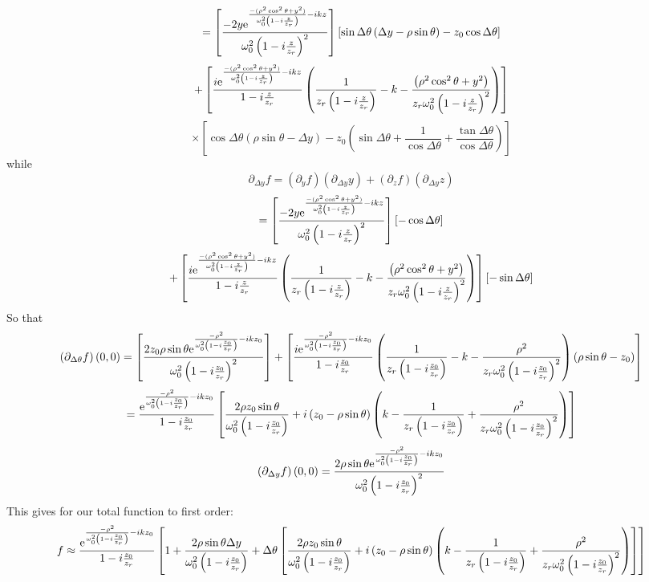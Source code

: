 \documentclass[11pt]{amsart}
\makeatletter
\newcommand{\e}{{\rm e}}				%
\newcommand{\0}{\varnothing}		%
\newcommand{\apr}{\approx}		%
\newcommand{\pp}{\partial}					%
\newcommand{\1}{!}
\newcommand{\2}{@}
\newcommand{\3}{\#}
\newcommand{\4}{\$}
\newcommand{\5}{\%}
\newcommand{\6}{$^\wedge$}
\newcommand{\7}{\&}
\newcommand{\8}{*}
\newcommand{\9}{(}
\makeatother
\begin{document}
\[
= \left[\frac{-2y\e^{\frac{-(\rho^2\cos^2\theta+y^2)}{\omega_0^2\left(1-i\frac{z}{z_r}\right)}-ikz}}{\omega_0^2\left(1-i\frac{z}{z_r}\right)^2}\right]\left[\sin \Delta \theta\left(\Delta y -\rho \sin \theta\right)-z_0\cos \Delta \theta\right]
\]
\[
+\left[\frac{i\e^{\frac{-(\rho^2\cos^2\theta+y^2)}{\omega_0^2\left(1-i\frac{z}{z_r}\right)}-ikz}}{1-i\frac{z}{z_r}}\left(\frac{1}{z_r\left(1-i\frac{z}{z_r}\right)}-k-\frac{\left(\rho^2\cos^2\theta+y^2\right)}{z_r\omega_0^2\left(1-i\frac{z}{z_r}\right)^2}\right)\right]\]\[\times\left[\cos \Delta \theta\left(\rho \sin \theta - \Delta y\right) -z_0\left(\sin \Delta \theta + \frac{1}{\cos \Delta \theta}+\frac{\tan\Delta \theta}{\cos\Delta \theta}\right)\right]
\]
while 
\[
\pp_{\Delta y}f = (\pp_y f)(\pp_{\Delta y} y) + (\pp_z f)(\pp_{\Delta y} z)
\]
\[
= \left[\frac{-2y\e^{\frac{-(\rho^2\cos^2\theta+y^2)}{\omega_0^2\left(1-i\frac{z}{z_r}\right)}-ikz}}{\omega_0^2\left(1-i\frac{z}{z_r}\right)^2}\right]\left[-\cos \Delta \theta\right]
\]
\[
+\left[\frac{i\e^{\frac{-(\rho^2\cos^2\theta+y^2)}{\omega_0^2\left(1-i\frac{z}{z_r}\right)}-ikz}}{1-i\frac{z}{z_r}}\left(\frac{1}{z_r\left(1-i\frac{z}{z_r}\right)}-k-\frac{\left(\rho^2\cos^2\theta+y^2\right)}{z_r\omega_0^2\left(1-i\frac{z}{z_r}\right)^2}\right)\right]\left[-\sin \Delta \theta\right]
\]
So that
\[
\left(\pp_{\Delta \theta}f \right)(0,0) = \left[\frac{2z_0\rho\sin \theta\e^{\frac{-\rho^2}{\omega_0^2\left(1-i\frac{z_0}{z_r}\right)}-ikz_0}}{\omega_0^2\left(1-i\frac{z_0}{z_r}\right)^2}\right] + \left[\frac{i\e^{\frac{-\rho^2}{\omega_0^2\left(1-i\frac{z_0}{z_r}\right)}-ikz_0}}{1-i\frac{z_0}{z_r}}\left(\frac{1}{z_r\left(1-i\frac{z_0}{z_r}\right)}-k-\frac{\rho^2}{z_r\omega_0^2\left(1-i\frac{z_0}{z_r}\right)^2}\right)\left(\rho\sin \theta - z_0\right)\right]
\]
\[
=\frac{\e^{\frac{-\rho^2}{\omega_0^2\left(1-i\frac{z_0}{z_r}\right)}-ikz_0}}{1-i\frac{z_0}{z_r}}\left[\frac{2\rho z_0\sin \theta}{\omega_0^2\left(1-i\frac{z_0}{z_r}\right)} + i\left(z_0-\rho\sin\theta\right)\left(k-\frac{1}{z_r\left(1-i\frac{z_0}{z_r}\right)}+\frac{\rho^2}{z_r\omega_0^2\left(1-i\frac{z_0}{z_r}\right)^2}\right)\right]
\]
\[
\left(\pp_{\Delta y} f\right)(0,0) = \frac{2\rho\sin \theta\e^{\frac{-\rho^2}{\omega_0^2\left(1-i\frac{z_0}{z_r}\right)}-ikz_0}}{\omega_0^2\left(1-i\frac{z_0}{z_r}\right)^2}
\]
This gives for our total function to first order:
\[
f \apr \frac{\e^{\frac{-\rho^2}{\omega_0^2\left(1-i\frac{z_0}{z_r}\right)}-ikz_0}}{1-i\frac{z_0}{z_r}}\left[1 + \frac{2\rho\sin\theta \Delta y}{\omega_0^2\left(1-i\frac{z_0}{z_r}\right)}+\Delta \theta\left[\frac{2\rho z_0\sin \theta}{\omega_0^2\left(1-i\frac{z_0}{z_r}\right)}+i\left(z_0-\rho\sin \theta\right)\left(k-\frac{1}{z_r\left(1-i\frac{z_0}{z_r}\right)}+\frac{\rho^2}{z_r\omega_0^2\left(1-i\frac{z_0}{z_r}\right)^2}\right)\right]\right]
\]
\end{document}
